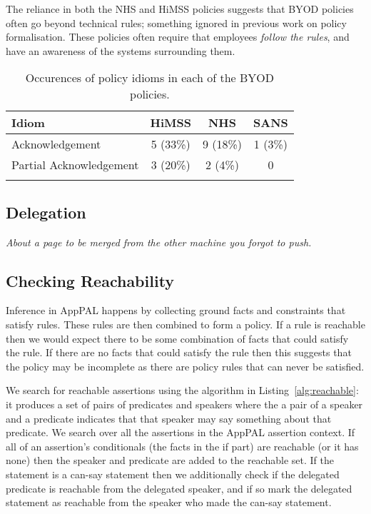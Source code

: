 \documentclass[a4paper]{article}
\begin{document}
The reliance in both the NHS and \ac{HiMSS} policies suggests that \ac{BYOD} policies often go beyond technical rules; something ignored in previous work on policy formalisation.
These policies often require that employees \emph{follow the rules}, and have an awareness of the systems surrounding them.

\begin{table}\centering
  \begin{tabular}{l c c c}
    \toprule
    Idiom                    & \ac{HiMSS}   & NHS      & SANS    \\
    \midrule
    Acknowledgement          & 5 (33\%) & 9 (18\%) & 1 (3\%) \\
    Partial Acknowledgement  & 3 (20\%) & 2 (4\%)  & 0       \\
    \bottomrule             \\
  \end{tabular}
  \label{tab:idioms}
  \caption{Occurences of policy idioms in each of the \ac{BYOD} policies.}
\end{table}

\subsection{Delegation}
\textit{About a page to be merged from the other machine you forgot to push. }




\subsection{Checking Reachability}

Inference in AppPAL happens by collecting ground facts and constraints that satisfy rules.
These rules are then combined to form a policy. 
If a rule is reachable then we would expect there to be some combination of facts that could satisfy the rule.
If there are no facts that could satisfy the rule then this suggests that the policy may be incomplete as there are policy rules that can never be satisfied.  

We search for reachable assertions using the algorithm in Listing~\ref{alg:reachable}:
it produces a set of pairs of predicates and speakers where the a pair of a speaker and a predicate indicates that that speaker may say something about that predicate.
We search over all the assertions in the AppPAL assertion context.
If all of an assertion's conditionals (the facts in the if part) are reachable (or it has none) then the speaker and predicate are added to the reachable set.
If the statement is a can-say statement then we additionally check if the delegated predicate is reachable from the delegated speaker, and if so mark the delegated statement as reachable from the speaker who made the can-say statement.
\end{document}
